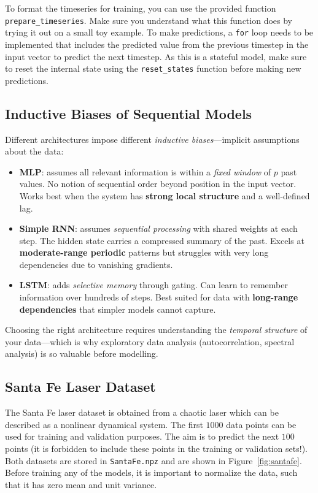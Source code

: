 To format the timeseries for training, you can use the provided function \texttt{prepare\_timeseries}.
Make sure you understand what this function does by trying it out on a small toy example.
To make predictions, a \texttt{for} loop needs to be implemented that includes the predicted value from the previous timestep in the input vector to predict the next timestep.
As this is a stateful model, make sure to reset the internal state using the \texttt{reset\_states} function before making new predictions.

\subsection*{Inductive Biases of Sequential Models}

\begin{insightbox}[title={Why does architecture matter?}]
Different architectures impose different \emph{inductive biases}---implicit assumptions about the data:
\begin{itemize}
    \item \textbf{MLP}: assumes all relevant information is within a \emph{fixed window} of $p$ past values.  No notion of sequential order beyond position in the input vector.  Works best when the system has \textbf{strong local structure} and a well-defined lag.
    \item \textbf{Simple RNN}: assumes \emph{sequential processing} with shared weights at each step.  The hidden state carries a compressed summary of the past.  Excels at \textbf{moderate-range periodic} patterns but struggles with very long dependencies due to vanishing gradients.
    \item \textbf{LSTM}: adds \emph{selective memory} through gating.  Can learn to remember information over hundreds of steps.  Best suited for data with \textbf{long-range dependencies} that simpler models cannot capture.
\end{itemize}
Choosing the right architecture requires understanding the \emph{temporal structure} of your data---which is why exploratory data analysis (autocorrelation, spectral analysis) is so valuable before modelling.
\end{insightbox}



\subsection*{Santa Fe Laser Dataset}
The Santa Fe laser dataset is obtained from a chaotic laser which can be described as a nonlinear dynamical system.
The first $1000$ data points can be used for training and validation purposes.
The aim is to predict the next $100$ points (it is forbidden to include these points in the training or validation sets!).
Both datasets are stored in \texttt{SantaFe.npz} and are shown in Figure~\ref{fig:santafe}.
Before training any of the models, it is important to normalize the data, such that it has zero mean and unit variance.

